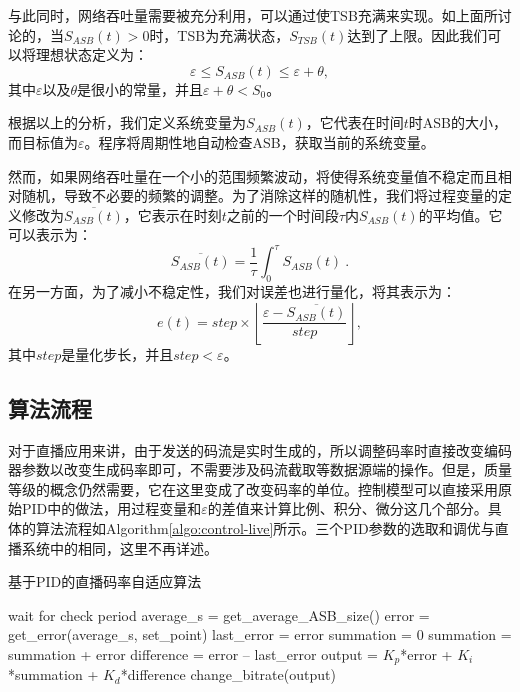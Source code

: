 与此同时，网络吞吐量需要被充分利用，可以通过使TSB充满来实现。如上面所讨论的，当$S_{ASB}(t)>0$时，TSB为充满状态，$S_{TSB}(t)$达到了上限。因此我们可以将理想状态定义为：
\begin{equation}
\varepsilon \le S_{ASB}(t) \le \varepsilon+\theta,
\end{equation}
其中$\varepsilon$以及$\theta$是很小的常量，并且$\varepsilon+\theta<S_0$。

根据以上的分析，我们定义系统变量为$S_{ASB}(t)$，它代表在时间$t$时ASB的大小，而目标值为$\varepsilon$。程序将周期性地自动检查ASB，获取当前的系统变量。

然而，如果网络吞吐量在一个小的范围频繁波动，将使得系统变量值不稳定而且相对随机，导致不必要的频繁的调整。为了消除这样的随机性，我们将过程变量的定义修改为$\overline{S_{ASB}(t)}$，它表示在时刻$t$之前的一个时间段$\tau$内$S_{ASB}(t)$的平均值。它可以表示为：
\begin{equation}
\label{eq:asb}
\overline{S_{ASB}(t)} = \dfrac{1}{\tau} \int_0^\tau {S_{ASB}(t)}\: .
\end{equation}
在另一方面，为了减小不稳定性，我们对误差也进行量化，将其表示为：
\begin{equation}
e(t) = step \times \left \lfloor\dfrac{\varepsilon - \overline{S_{ASB}(t)}}{step} \right \rfloor,
\end{equation}
其中$step$是量化步长，并且$step<\varepsilon$。

\subsection{算法流程}

对于直播应用来讲，由于发送的码流是实时生成的，所以调整码率时直接改变编码器参数以改变生成码率即可，不需要涉及码流截取等数据源端的操作。但是，质量等级的概念仍然需要，它在这里变成了改变码率的单位。控制模型可以直接采用原始PID中的做法，用过程变量和$\varepsilon$的差值来计算比例、积分、微分这几个部分。具体的算法流程如Algorithm\ref{algo:control-live}所示。三个PID参数的选取和调优与直播系统中的相同，这里不再详述。

\begin{algorithm}
	\caption{基于PID的直播码率自适应算法}
	\label{algo:control-live}
	\begin{algorithmic}
		\STATE wait for check period
		\STATE average\_s = get\_average\_ASB\_size()
		\STATE error = get\_error(average\_s, set\_point)
			\STATE last\_error = error
			\STATE summation = 0
		\ELSE
			\STATE summation = summation + error
			\STATE difference = error – last\_error
			\STATE output = $K_p$*error + $K_i$*summation + $K_d$*difference
			\STATE change\_bitrate(output)
		\ENDIF
		\ENDWHILE
	\end{algorithmic}
\end{algorithm}

